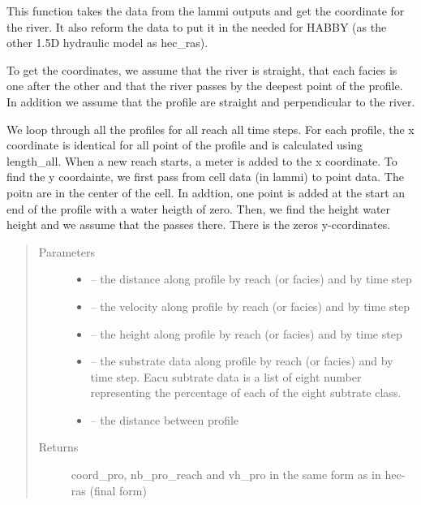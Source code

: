 \documentclass[letterpaper,10pt,english]{sphinxmanual}
\begin{document}
\begin{fulllineitems}
\label{\detokenize{index:src.lammi.coord_lammi}}
This function takes the data from the lammi outputs and get the coordinate for the river. It also
reform the data to put it in the needed for HABBY (as the other 1.5D hydraulic model as hec\_ras).

To get the coordinates, we assume that the river is straight, that each facies is one after the other and
that the river passes by the deepest point of the profile. In addition we assume that the profile are straight
and perpendicular to the river.

We loop through all the profiles for all reach all time steps. For each profile, the x coordinate is identical
for all point of the profile and is calculated using length\_all. When a new reach starts, a meter is added to the x
coordinate. To find the y coordainte, we first pass from cell data (in lammi) to point data. The poitn are in the
center of the cell. In addtion, one point is added at the start an end of the profile with a water heigth of zero.
Then, we find the height water height and we assume that the passes there. There is the zeros y-ccordinates.
\begin{quote}\begin{description}
\item[{Parameters}] \leavevmode\begin{itemize}
\item {} 
 -- the distance along profile by reach (or facies) and by time step

\item {} 
 -- the velocity along profile by reach (or facies) and by time step

\item {} 
 -- the height along profile by reach (or facies) and by time step

\item {} 
 -- the substrate data along profile by reach (or facies) and by time step. Eacu subtrate data is a list
of eight number representing the percentage of each of the eight subtrate class.

\item {} 
 -- the distance between profile

\end{itemize}

\item[{Returns}] \leavevmode
coord\_pro, nb\_pro\_reach and vh\_pro in the same form as in hec-ras (final form)

\end{description}\end{quote}

\end{fulllineitems}
\end{document}
